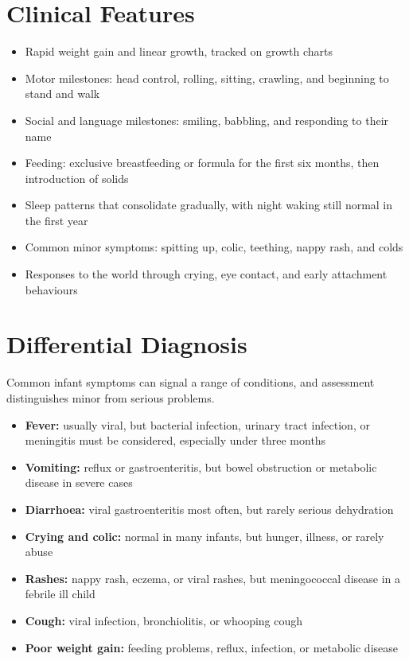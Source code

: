 \section*{Clinical Features}
\begin{itemize}
    \item Rapid weight gain and linear growth, tracked on growth charts
    \item Motor milestones: head control, rolling, sitting, crawling, and beginning to stand and walk
    \item Social and language milestones: smiling, babbling, and responding to their name
    \item Feeding: exclusive breastfeeding or formula for the first six months, then introduction of solids
    \item Sleep patterns that consolidate gradually, with night waking still normal in the first year
    \item Common minor symptoms: spitting up, colic, teething, nappy rash, and colds
    \item Responses to the world through crying, eye contact, and early attachment behaviours
\end{itemize}

\section*{Differential Diagnosis}
Common infant symptoms can signal a range of conditions, and assessment distinguishes minor from serious problems.
\begin{itemize}
    \item \textbf{Fever:} usually viral, but bacterial infection, urinary tract infection, or meningitis must be considered, especially under three months
    \item \textbf{Vomiting:} reflux or gastroenteritis, but bowel obstruction or metabolic disease in severe cases
    \item \textbf{Diarrhoea:} viral gastroenteritis most often, but rarely serious dehydration
    \item \textbf{Crying and colic:} normal in many infants, but hunger, illness, or rarely abuse
    \item \textbf{Rashes:} nappy rash, eczema, or viral rashes, but meningococcal disease in a febrile ill child
    \item \textbf{Cough:} viral infection, bronchiolitis, or whooping cough
    \item \textbf{Poor weight gain:} feeding problems, reflux, infection, or metabolic disease
\end{itemize}

